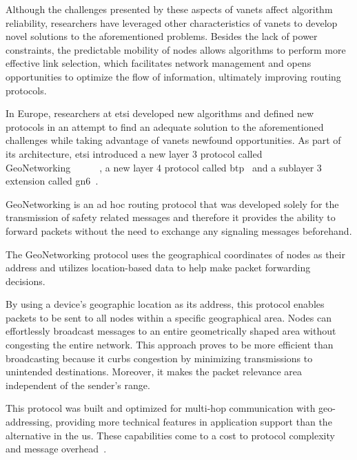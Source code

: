 Although the challenges presented by these aspects of \glspl{vanet} affect algorithm reliability, researchers have leveraged other characteristics of \glspl{vanet} to develop novel solutions to the aforementioned problems. Besides the lack of power constraints, the predictable mobility of nodes allows algorithms to perform more effective link selection, which facilitates network management and opens opportunities to optimize the flow of information, ultimately improving routing protocols.

In Europe, researchers at \gls{etsi} developed new algorithms and defined new protocols in an attempt to find an adequate solution to the aforementioned challenges while taking advantage of \glspl{vanet} newfound opportunities. As part of its architecture, \gls{etsi} introduced a new layer 3 protocol called GeoNetworking~\cite{etsi_intelligent_2014-1}~\cite{etsi_intelligent_2013-1}~\cite{etsi_intelligent_2014}~\cite{etsi_intelligent_2020-1}~\cite{etsi_intelligent_2019}~\cite{etsi_intelligent_2014-2}, a new layer 4 protocol called \gls{btp}~\cite{etsi_intelligent_2019} and a sublayer 3 extension called \gls{gn6}~\cite{etsi_intelligent_2014-2}.

GeoNetworking is an ad hoc routing protocol that was developed solely for the transmission of safety related messages and therefore it provides the ability to forward packets without the need to exchange any signaling messages beforehand.

The GeoNetworking protocol uses the geographical coordinates of nodes as their address and utilizes location-based data to help make packet forwarding decisions. 

By using a device's geographic location as its address, this protocol enables packets to be sent to all nodes within a specific geographical area. Nodes can effortlessly broadcast messages to an entire geometrically shaped area without congesting the entire network. This approach proves to be more efficient than broadcasting because it curbs congestion by minimizing transmissions to unintended destinations. Moreover, it makes the packet relevance area independent of the sender's range.

This protocol was built and optimized for multi-hop communication with geo-addressing, providing more technical features in application support than the alternative in the \gls{us}. These capabilities come to a cost to protocol complexity and message overhead~\cite{festag_standards_2015}.

